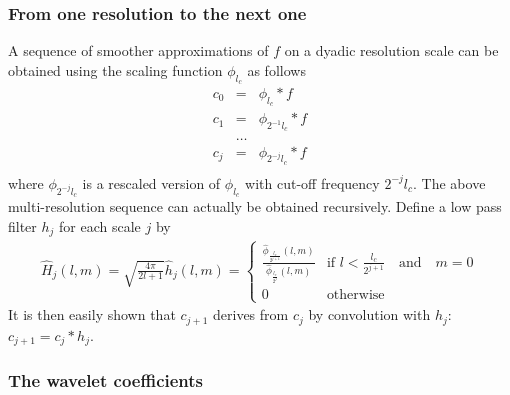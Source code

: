 \subsubsection*{From one resolution to the next one}

A sequence of smoother approximations of $f$ on a dyadic resolution scale can be obtained using the scaling function $\phi_{l_c}$ as follows
\begin{eqnarray}
c_0   & = &  \phi_{ l_{c} }  * f    \nonumber    \\
c_1   & = &  \phi_{2^{-1} l_{c} }   * f    \nonumber	   \\
&\ldots&\nonumber\\ 
c_j    &=&   \phi_{2^{-j}  l_{c}  }  * f  \nonumber    \\
\end{eqnarray}
where $\phi_{2^{-j} l_{c} }$ is a rescaled version of $\phi_{l_{c}}$ with cut-off frequency $2^{-j} l_{c}$. The above multi-resolution sequence 
can actually be obtained recursively. Define a low pass filter $h_{j}$ for each scale $j$ by 
\begin{eqnarray}
 \hat{H}_{j}(l,m) = \sqrt{\frac{4\pi}{2l+1} }  \hat h_{j}(l,m) = \left\{
  \begin{array}{ll}
  \frac {   \hat \phi_{\frac{l_{c}}{2^{j+1}} }(l,m)   }   {  \hat  \phi_{  \frac{l_{c}}{2^{j}} }(l,m)   } & \mbox{if }  l  < \frac{ l_{c}} {2^{j+1}} \quad \textrm{and}\quad m = 0\\
0 & \mbox{otherwise } \ 
  \end{array}
  \right.
\end{eqnarray}
It is then easily shown that $c_{j+1}$ derives from $c_j$ by convolution with $h_j$:  $c_{j+1} = c_{j} * h_j$.

\subsubsection*{The wavelet coefficients}

